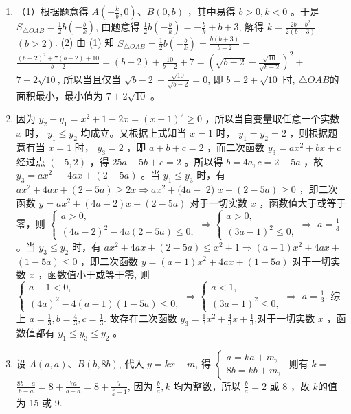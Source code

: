 \documentclass[10pt]{article}
\begin{document}
\begin{enumerate}
  \item （1）根据题意得 $A\left(-\frac{k}{b}, 0\right) 、 B(0, b)$ ，其中易得 $b>0, k<0$ 。于是 $S_{\triangle O A B}=\frac{1}{2} b\left(-\frac{b}{k}\right)$, 由题意得 $\frac{1}{2} b\left(-\frac{b}{k}\right)=-\frac{b}{k}+b+3$, 解得 $k=\frac{2 b-b^{2}}{2(b+3)}$ $(b>2)$. (2) 由 (1) 知 $S_{\triangle O A B}=\frac{1}{2} b\left(-\frac{b}{k}\right)=\frac{b(b+3)}{b-2}=$ $\frac{(b-2)^{2}+7(b-2)+10}{b-2}=(b-2)+\frac{10}{b-2}+7=\left(\sqrt{b-2}-\frac{\sqrt{10}}{\sqrt{b-2}}\right)^{2}+$ $7+2 \sqrt{10}$, 所以当且仅当 $\sqrt{b-2}-\frac{\sqrt{10}}{\sqrt{b-2}}=0$, 即 $b=2+\sqrt{10}$ 时, $\triangle O A B$的面积最小，最小值为 $7+2 \sqrt{10}$ 。
  \item 因为 $y_{2}-y_{1}=x^{2}+1-2 x=(x-1)^{2} \geqslant 0$ ，所以当自变量取任意一个实数 $x$ 时， $y_{1} \leqslant y_{2}$ 均成立。又根据上式知当 $x=1$ 时， $y_{1}=y_{2}=2$ ，则根据题意有当 $x=1$ 时， $y_{3}=2$ ，即 $a+b+c=2$ ，而二次函数 $y_{3}=a x^{2}+b x+c$ 经过点 $(-5,2)$ ，得 $25 a-5 b+c=2$ 。所以得 $b=4 a, c=2-5 a$ ，故 $y_{3}=a x^{2}+$ $4 a x+(2-5 a)$ 。当 $y_{1} \leqslant y_{3}$ 时，有 $a x^{2}+4 a x+(2-5 a) \geqslant 2 x \Rightarrow a x^{2}+(4 a-$ 2) $x+(2-5 a) \geqslant 0$ ，即二次函数 $y=a x^{2}+(4 a-2) x+(2-5 a)$ 对于一切实数 $x$ ，函数值大于或等于零，则 $\left\{\begin{array}{l}a>0, \\ (4 a-2)^{2}-4 a(2-5 a) \leqslant 0,\end{array} \Rightarrow\left\{\begin{array}{l}a>0, \\ (3 a-1)^{2} \leqslant 0,\end{array} \Rightarrow\right.\right.$ $a=\frac{1}{3}$ 。当 $y_{3} \leqslant y_{2}$ 时，有 $a x^{2}+4 a x+(2-5 a) \leqslant x^{2}+1 \Rightarrow(a-1) x^{2}+4 a x+$ $(1-5 a) \leqslant 0$ ，即二次函数 $y=(a-1) x^{2}+4 a x+(1-5 a)$ 对于一切实数 $x$ ，函数值小于或等于零, 则 $\left\{\begin{array}{l}a-1<0, \\ (4 a)^{2}-4(a-1)(1-5 a) \leqslant 0,\end{array} \Rightarrow\left\{\begin{array}{l}a<1, \\ (3 a-1)^{2} \leqslant 0,\end{array} \Rightarrow\right.\right.$ $a=\frac{1}{3}$. 综上 $a=\frac{1}{3}, b=\frac{4}{3}, c=\frac{1}{3}$. 故存在二次函数 $y_{3}=\frac{1}{3} x^{2}+\frac{4}{3} x+\frac{1}{3}$,对于一切实数 $x$ ，函数值都有 $y_{1} \leqslant y_{3} \leqslant y_{2}$ 。
  \item 设 $A(a, a) 、 B(b, 8 b)$, 代入 $y=k x+m$, 得 $\left\{\begin{array}{l}a=k a+m, \\ 8 b=k b+m,\end{array}\right.$ 则有 $k=$ $\frac{8 b-a}{b-a}=8+\frac{7 a}{b-a}=8+\frac{7}{\frac{b}{a}-1}$, 因为 $\frac{b}{a}, k$ 均为整数，所以 $\frac{b}{a}=2$ 或 8 ，故 $k$的值为 15 或 9.

\end{enumerate}
\end{document}
